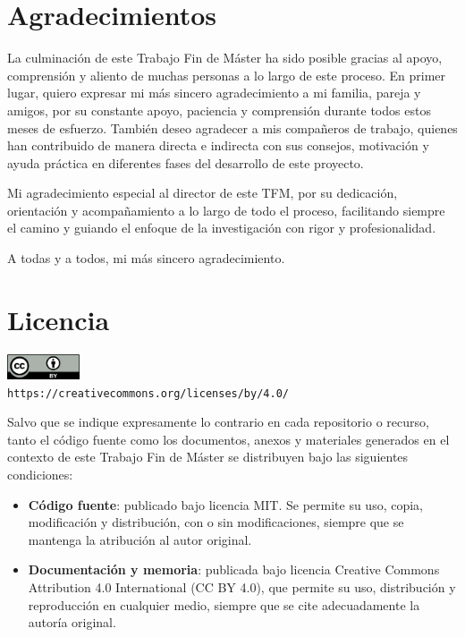 \section*{Agradecimientos}
\label{sec:agradecimientos}

\vspace{-0.4em}

La culminación de este Trabajo Fin de Máster ha sido posible gracias al apoyo, comprensión y aliento de muchas personas a lo largo de este proceso.  
En primer lugar, quiero expresar mi más sincero agradecimiento a mi familia, pareja y amigos, por su constante apoyo, paciencia y comprensión durante todos estos meses de esfuerzo.  
También deseo agradecer a mis compañeros de trabajo, quienes han contribuido de manera directa e indirecta con sus consejos, motivación y ayuda práctica en diferentes fases del desarrollo de este proyecto.

Mi agradecimiento especial al director de este TFM, por su dedicación, orientación y acompañamiento a lo largo de todo el proceso, facilitando siempre el camino y guiando el enfoque de la investigación con rigor y profesionalidad.

A todas y a todos, mi más sincero agradecimiento.

\section*{Licencia}
\label{sec:licencia}

\vspace{-0.4em}

\begin{center}
	\includegraphics[width=0.16\textwidth]{includes/by.png}\\[0.5em]
	\small
	\texttt{https://creativecommons.org/licenses/by/4.0/}
\end{center}

Salvo que se indique expresamente lo contrario en cada repositorio o recurso, tanto el código fuente como los documentos, anexos y materiales generados en el contexto de este Trabajo Fin de Máster se distribuyen bajo las siguientes condiciones:

\begin{itemize}
	\item \textbf{Código fuente}: publicado bajo licencia MIT. Se permite su uso, copia, modificación y distribución, con o sin modificaciones, siempre que se mantenga la atribución al autor original.
	\item \textbf{Documentación y memoria}: publicada bajo licencia Creative Commons Attribution 4.0 International (CC BY 4.0), que permite su uso, distribución y reproducción en cualquier medio, siempre que se cite adecuadamente la autoría original.
\end{itemize}

